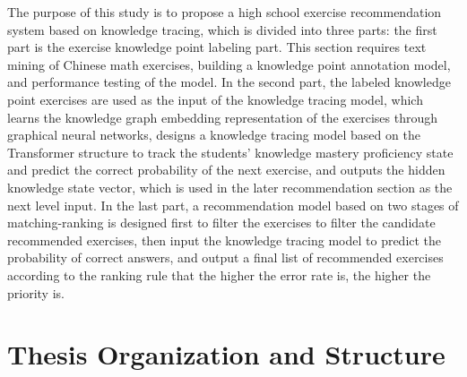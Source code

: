 The purpose of this study is to propose a high school exercise recommendation system based on knowledge tracing, which is divided into three parts: the first part is the exercise knowledge point labeling part. This section requires text mining of Chinese math exercises, building a knowledge point annotation model, and performance testing of the model. In the second part, the labeled knowledge point exercises are used as the input of the knowledge tracing model, which learns the knowledge graph embedding representation of the exercises through graphical neural networks, designs a knowledge tracing model based on the Transformer structure to track the students' knowledge mastery proficiency state and predict the correct probability of the next exercise, and outputs the hidden knowledge state vector, which is used in the later recommendation section as the next level input. In the last part, a recommendation model based on two stages of matching-ranking is designed first to filter the exercises to filter the candidate recommended exercises, then input the knowledge tracing model to predict the probability of correct answers, and output a final list of recommended exercises according to the ranking rule that the higher the error rate is, the higher the priority is.

\section{Thesis Organization and Structure}

